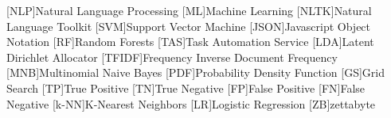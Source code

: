 \documentclass[a4paper,11pt,svgnames]{book}
\begin{document}
	[NLP]{Natural Language Processing}
	[ML]{Machine Learning}
	[NLTK]{Natural Language Toolkit}
	[SVM]{Support Vector Machine}
	[JSON]{Javascript Object Notation}
	[RF]{Random Forests}
	[TAS]{Task Automation Service}
	[LDA]{Latent Dirichlet Allocator}
	[TFIDF]{Frequency Inverse Document Frequency}
	[MNB]{Multinomial Naive Bayes}
	[PDF]{Probability Density Function}
	[GS]{Grid Search}
	[TP]{True Positive}
	[TN]{True Negative}
	[FP]{False Positive}
	[FN]{False Negative}
	[k-NN]{K-Nearest Neighbors}
	[LR]{Logistic Regression}
	[ZB]{zettabyte}
	\newcommand\litem[1]{\item{\bfseries #1 }}
	\renewcommand{\arraystretch}{1.5} %
	
	\newcommand\headcell[1]{%
	  \multicolumn{1}{|c|}{\cellcolor{DodgerBlue}\bfseries\sffamily\textcolor{white}{#1}}
	}
	
	
	
	
		
	
	
	
	
	
	
	
	\pagestyle{fancy}
	\fancyhf{}
	\fancyhead[RO]{\sffamily \slshape \rightmark}
	\fancyhead[LE]{\sffamily \slshape \leftmark}
	\fancyfoot[OR,EL]{\rmfamily \thepage} %
	
	
	
	
	
	
	
	
	
	\appendix
	
	
	\nocite{*}
	
	{
	\small
	
	}
	
\end{document}
